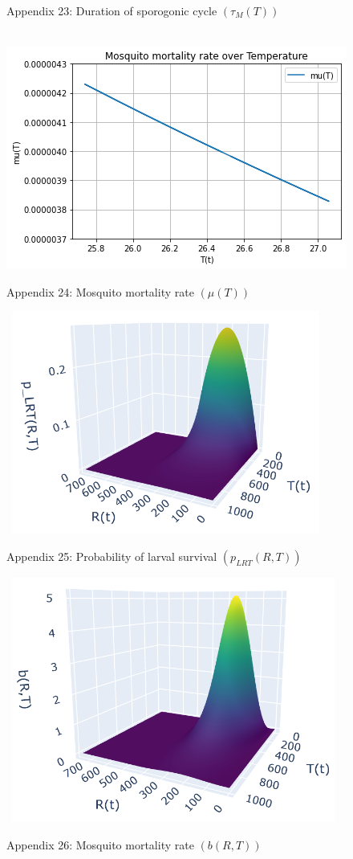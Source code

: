 \documentclass[
	12pt,				%
	oneside,			%
	a4paper,			%
	english,			%
	brazil				%
	]{abntex2}
\begin{document}
\begin{apendicesenv}
\begin{figure}[!ht]
	\caption*{Appendix 23: Duration of sporogonic cycle $(\tau_M(T))$}
\end{figure} 
\begin{figure}[!ht]
	\centering
	\hbox{\hspace{2.0em} \includegraphics[scale=0.8] {THESIS-Plot_mu(T).png}}
	\caption*{Appendix 24: Mosquito mortality rate $(\mu(T))$}
\end{figure}
\newpage
\begin{figure}[!ht]
	\centering
	\hbox{\hspace{4.0em} \includegraphics[scale=1.2] {THESIS-Plot_p_LRT(R_T).png}}
	\caption*{Appendix 25: Probability of larval survival $(p_{LRT}(R,T))$}
\end{figure} 
\begin{figure}[!ht]
	\centering
	\hbox{\hspace{4.0em} \includegraphics[scale=1.2] {THESIS-Plot_b(R_T).png}}
	\caption*{Appendix 26: Mosquito mortality rate $(b(R,T))$}
\end{figure}
\newpage


\end{apendicesenv}
\end{document}
